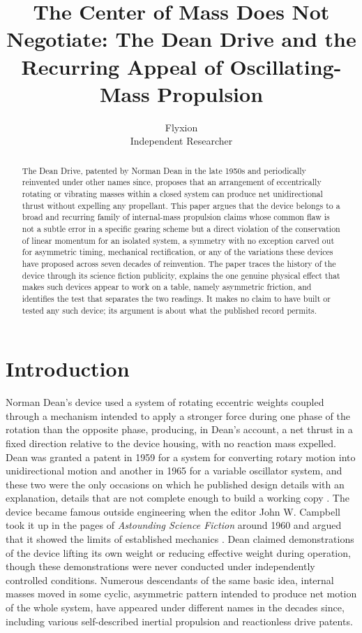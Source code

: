 \documentclass[11pt]{article}
\title{The Center of Mass Does Not Negotiate: The Dean Drive and the Recurring Appeal of Oscillating-Mass Propulsion}
\author{Flyxion \\ \small Independent Researcher}
\date{}
\begin{document}
\maketitle

\begin{abstract}
The Dean Drive, patented by Norman Dean in the late 1950s and periodically reinvented under other names since, proposes that an arrangement of eccentrically rotating or vibrating masses within a closed system can produce net unidirectional thrust without expelling any propellant. This paper argues that the device belongs to a broad and recurring family of internal-mass propulsion claims whose common flaw is not a subtle error in a specific gearing scheme but a direct violation of the conservation of linear momentum for an isolated system, a symmetry with no exception carved out for asymmetric timing, mechanical rectification, or any of the variations these devices have proposed across seven decades of reinvention. The paper traces the history of the device through its science fiction publicity, explains the one genuine physical effect that makes such devices appear to work on a table, namely asymmetric friction, and identifies the test that separates the two readings. It makes no claim to have built or tested any such device; its argument is about what the published record permits.
\end{abstract}

\section{Introduction}

Norman Dean's device used a system of rotating eccentric weights coupled through a mechanism intended to apply a stronger force during one phase of the rotation than the opposite phase, producing, in Dean's account, a net thrust in a fixed direction relative to the device housing, with no reaction mass expelled. Dean was granted a patent in 1959 for a system for converting rotary motion into unidirectional motion and another in 1965 for a variable oscillator system, and these two were the only occasions on which he published design details with an explanation, details that are not complete enough to build a working copy \cite{D1959,D1965}. The device became famous outside engineering when the editor John W. Campbell took it up in the pages of \emph{Astounding Science Fiction} around 1960 and argued that it showed the limits of established mechanics \cite{C1960}. Dean claimed demonstrations of the device lifting its own weight or reducing effective weight during operation, though these demonstrations were never conducted under independently controlled conditions. Numerous descendants of the same basic idea, internal masses moved in some cyclic, asymmetric pattern intended to produce net motion of the whole system, have appeared under different names in the decades since, including various self-described inertial propulsion and reactionless drive patents.
\end{document}
